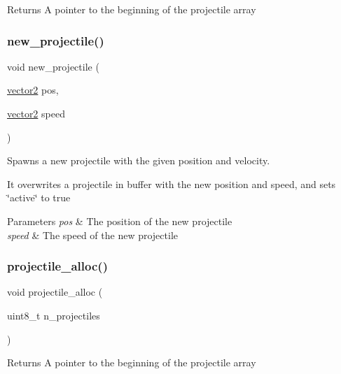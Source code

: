 \begin{DoxyReturn}{Returns}
A pointer to the beginning of the projectile array 
\end{DoxyReturn}
\mbox{\label{group__projectiles_ga1dcccbbcaf5fbc336ec52666ff0960ac}} 
\subsubsection{\texorpdfstring{new\+\_\+projectile()}{new\_projectile()}}
{\footnotesize\ttfamily void new\+\_\+projectile (\begin{DoxyParamCaption}\item[{\hyperlink{structvector2}{vector2}}]{pos,  }\item[{\hyperlink{structvector2}{vector2}}]{speed }\end{DoxyParamCaption})}



Spawns a new projectile with the given position and velocity. 

It overwrites a projectile in buffer with the new position and speed, and sets \char`\"{}active\char`\"{} to true


\begin{DoxyParams}{Parameters}
{\em pos} & The position of the new projectile \\
\hline
{\em speed} & The speed of the new projectile \\
\hline
\end{DoxyParams}
\mbox{\label{group__projectiles_ga1b3d00bd49fc0770838c70cb1d2d9e94}} 
\subsubsection{\texorpdfstring{projectile\+\_\+alloc()}{projectile\_alloc()}}
{\footnotesize\ttfamily void projectile\+\_\+alloc (\begin{DoxyParamCaption}\item[{uint8\+\_\+t}]{n\+\_\+projectiles }\end{DoxyParamCaption})}

\begin{DoxyReturn}{Returns}
A pointer to the beginning of the projectile array 
\end{DoxyReturn}
